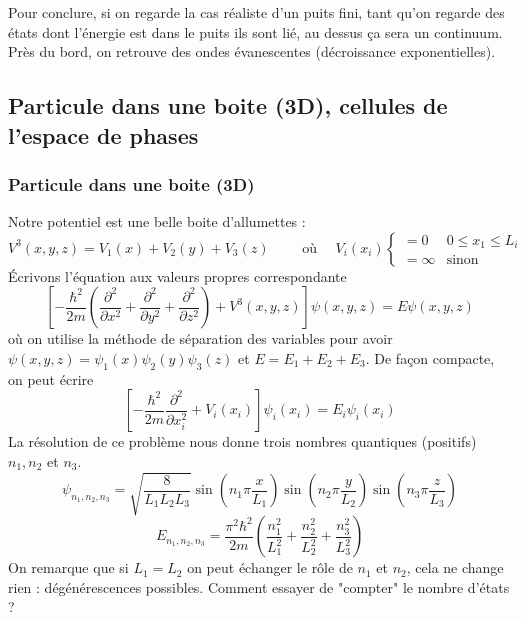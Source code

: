 		Pour conclure, si on regarde la cas réaliste d'un puits fini, tant qu'on regarde 
		des états dont l'énergie est dans le puits ils sont lié, au dessus ça sera un 
		continuum. Près du bord, on retrouve des ondes évanescentes (décroissance exponentielles). 


	\subsection{Particule dans une boite (3D), cellules de l'espace de phases}
		\subsubsection{Particule dans une boite (3D)}	
		Notre potentiel est une belle boite d'allumettes :
		\begin{equation}
		V^3(x,y,z) = V_1(x) + V_2(y)+V_3(z)\qquad\text{ où }\quad V_i(x_i) \left\{\begin{array}{ll}
		=0 & 0\leq x_1\leq L_i\\
		=\infty & \text{sinon}
		\end{array}\right.
		\end{equation}				
		Écrivons l'équation aux valeurs propres correspondante
		\begin{equation}
		\left[-\frac{\hbar^2}{2m}\left(\dfrac{\partial^2}{\partial x^2}+\dfrac{\partial^2}{\partial y^2}+
		\dfrac{\partial^2}{\partial z^2}\right)+V^3(x,y,z)\right]\psi(x,y,z) = E\psi(x,y,z)
		\end{equation}
		où on utilise la méthode de séparation des variables pour avoir $\psi(x,y,z) = \psi_1(x)\psi_2(y)\psi_3(z)$
		 et $E=E_1+E_2+E_3$. De façon compacte, on peut écrire
		\begin{equation}
		\left[-\frac{\hbar^2}{2m}\dfrac{\partial^2}{\partial x_i^2}+V_i(x_i)\right]\psi_i(x_i) = E_i\psi_i(x_i)
		\end{equation}
		La résolution de ce problème nous donne trois nombres quantiques (positifs) $n_1,n_2$ et $n_3$.
		\begin{equation}
		\psi_{n_1,n_2,n_3} = \sqrt{\dfrac{8}{L_1L_2L_3}}\sin\left(n_1\pi\frac{x}{L_1}\right)
		\sin\left(n_2\pi\frac{y}{L_2}\right)\sin\left(n_3\pi\frac{z}{L_3}\right)
		\end{equation}				
		\begin{equation}
		E_{n_1,n_2,n_3} = \dfrac{\pi^2\hbar^2}{2m}\left(\dfrac{n_1^2}{L_1^2}+\dfrac{n_2^2}{L_2^2}+
		\dfrac{n_3^2}{L_3^2}\right)
		\end{equation}
		On remarque que si $L_1=L_2$ on peut échanger le rôle de $n_1$ et $n_2$, 	cela ne change rien :
		dégénérescences possibles. Comment essayer de "compter" le nombre d'états ?
		
